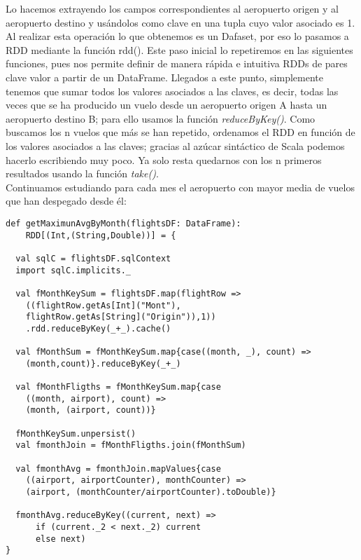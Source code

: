 Lo hacemos extrayendo los campos correspondientes al aeropuerto origen y al aeropuerto destino y usándolos como clave en una tupla cuyo valor asociado es 1. Al realizar esta operación lo que obtenemos es un Dafaset, por eso lo pasamos a RDD mediante la función rdd(). Este paso inicial lo repetiremos en las siguientes funciones, pues nos permite definir de manera rápida e intuitiva RDDs de pares clave valor a partir de un DataFrame. Llegados a este punto, simplemente tenemos que sumar todos los valores asociados a las claves, es decir, todas las veces que se ha producido un vuelo desde un aeropuerto origen A hasta un aeropuerto destino B; para ello usamos la función \textit{reduceByKey()}. Como buscamos los n vuelos que más se han repetido, ordenamos el RDD en función de los valores asociados a las claves; gracias al azúcar sintáctico de Scala podemos hacerlo escribiendo muy poco. Ya solo resta quedarnos con los n primeros resultados usando la función \textit{take()}.\\


Continuamos estudiando para cada mes el aeropuerto con mayor media de vuelos que han despegado desde él:\\

\begin{lstlisting}[frame=single]
def getMaximunAvgByMonth(flightsDF: DataFrame): 
	RDD[(Int,(String,Double))] = {
  
  val sqlC = flightsDF.sqlContext
  import sqlC.implicits._

  val fMonthKeySum = flightsDF.map(flightRow =>
    ((flightRow.getAs[Int]("Mont"), 
    flightRow.getAs[String]("Origin")),1))
    .rdd.reduceByKey(_+_).cache()

  val fMonthSum = fMonthKeySum.map{case((month, _), count) =>
    (month,count)}.reduceByKey(_+_)

  val fMonthFligths = fMonthKeySum.map{case
  	((month, airport), count) =>
    (month, (airport, count))}

  fMonthKeySum.unpersist()
  val fmonthJoin = fMonthFligths.join(fMonthSum)

  val fmonthAvg = fmonthJoin.mapValues{case 
  	((airport, airportCounter), monthCounter) =>
  	(airport, (monthCounter/airportCounter).toDouble)}
  
  fmonthAvg.reduceByKey((current, next) =>
      if (current._2 < next._2) current
      else next)
}
\end{lstlisting}

